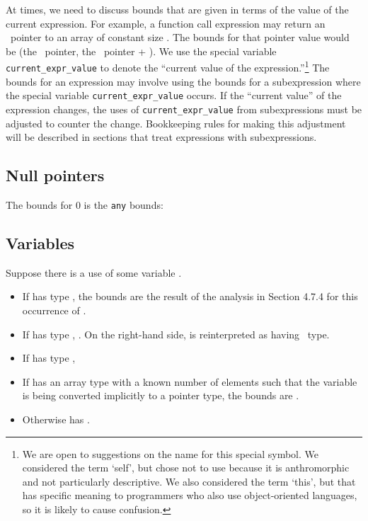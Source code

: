 At times, we need to discuss bounds that are given in terms of the value
of the current expression. For example, a function call expression may
return an \arrayptr\ pointer to an array of constant size
. The bounds for that pointer value would be (the
\arrayptr\ pointer, the \arrayptr\ pointer +
). We use the special variable \texttt{current\_expr\_value} to
denote the ``current value of the expression.''\footnote{We are open to
  suggestions on the name for this special symbol. We considered the
  term `self', but chose not to use because it is anthromorphic and not
  particularly descriptive. We also considered the term `this', but that
  has specific meaning to programmers who also use object-oriented
  languages, so it is likely to cause confusion.} The bounds for an
expression may involve using the bounds for a subexpression where the
special variable \texttt{current\_expr\_value} occurs. If the ``current
value'' of the expression changes, the uses of
\texttt{current\_expr\_value} from subexpressions must be adjusted to
counter the change. Bookkeeping rules for making this adjustment will be
described in sections that treat expressions with subexpressions.

\subsection{Null pointers}
\label{null-pointers}

The bounds for 0 is the \texttt{any} bounds:


\subsection{Variables}
\label{variables}

Suppose there is a use of some variable .

\begin{itemize}
\item
  If  has type \arrayptr, the bounds are the result of
  the analysis in Section 4.7.4 for this occurrence of .
\item
  If  has type \ptrT, 
  .
   On the right-hand side,  is reinterpreted as having \arrayptr\ type.
\item
  If  has type
  \arrayviewT, 
\item
  If  has an array type with a known number of elements 
  such that the variable is being converted implicitly to a pointer
  type, the bounds are  .
\item
  Otherwise  has \boundsnone.
\end{itemize}


